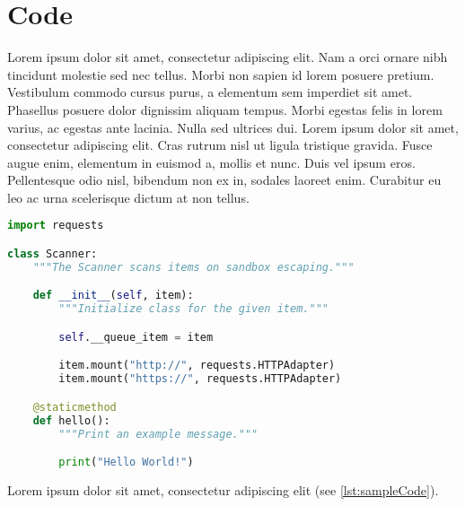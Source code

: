 \chapter{Code}

Lorem ipsum dolor sit amet, consectetur adipiscing elit. Nam a orci ornare nibh tincidunt molestie sed nec tellus. Morbi non sapien id lorem posuere pretium. Vestibulum commodo cursus purus, a elementum sem imperdiet sit amet. Phasellus posuere dolor dignissim aliquam tempus. Morbi egestas felis in lorem varius, ac egestas ante lacinia. Nulla sed ultrices dui. Lorem ipsum dolor sit amet, consectetur adipiscing elit. Cras rutrum nisl ut ligula tristique gravida. Fusce augue enim, elementum in euismod a, mollis et nunc. Duis vel ipsum eros. Pellentesque odio nisl, bibendum non ex in, sodales laoreet enim. Curabitur eu leo ac urna scelerisque dictum at non tellus.

\begin{lstlisting}[caption={A sample Python listing},label={lst:sampleCode},language=Python]
import requests

class Scanner:
    """The Scanner scans items on sandbox escaping."""

    def __init__(self, item):
        """Initialize class for the given item."""

        self.__queue_item = item

        item.mount("http://", requests.HTTPAdapter)
        item.mount("https://", requests.HTTPAdapter)

    @staticmethod
    def hello():
    	"""Print an example message."""

    	print("Hello World!")
\end{lstlisting}

Lorem ipsum dolor sit amet, consectetur adipiscing elit (see \ref{lst:sampleCode}).
